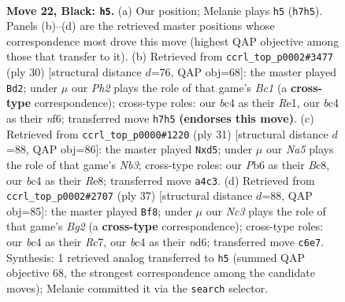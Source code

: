 \documentclass[11pt]{article}
\begin{document}
\clearpage

\begin{figure}[p]\centering
\begin{subfigure}{0.46\textwidth}\centering
\resizebox{\linewidth}{!}{%
\newchessgame
\chessboard[
  setfen={r1b4r/5k1p/ppn1p1p1/4Pp2/nbB2B2/1N3NP1/PP3P1P/RK1R4 b - - 5 22},
  showmover=false,
  pgfstyle=straightmove, color=movearrow, markmove={h7-h5}
]}
\caption{}
\end{subfigure}\hfill
\begin{subfigure}{0.46\textwidth}\centering
\resizebox{\linewidth}{!}{%
\newchessgame
\chessboard[
  setfen={rn3rk1/1p1bppbp/5np1/1p1P4/7N/2N3P1/PP3PBP/R1B1R1K1 w - - 0 16},
  showmover=false,
  pgfstyle=straightmove, color=movearrow, markmove={c1-d2}
]}
\caption{}
\end{subfigure}
\\[4pt]
\begin{subfigure}{0.46\textwidth}\centering
\resizebox{\linewidth}{!}{%
\newchessgame
\chessboard[
  setfen={r1b1r1k1/1p3p1p/pn1p2p1/2pP4/5Bn1/2P2NP1/P3PPBP/R3R1K1 b - - 0 16},
  showmover=false,
  pgfstyle=straightmove, color=movearrow, markmove={b6-d5}
]}
\caption{}
\end{subfigure}\hfill
\begin{subfigure}{0.46\textwidth}\centering
\resizebox{\linewidth}{!}{%
\newchessgame
\chessboard[
  setfen={r5k1/1pr2pb1/p2Nb1p1/4p2n/2P1P3/P3BP2/1P1R3P/2K2BR1 b - - 0 19},
  showmover=false,
  pgfstyle=straightmove, color=movearrow, markmove={g7-f8}
]}
\caption{}
\end{subfigure}
\caption{\textbf{Move 22, Black: \texttt{h5}.} (a) Our position; Melanie plays \texttt{h5} (\texttt{h7h5}). Panels (b)--(d) are the retrieved master positions whose correspondence most drove this move (highest QAP objective among those that transfer to it). (b) Retrieved from \texttt{ccrl\_top\_p0002\#3477} (ply 30) [structural distance $d$=76, QAP obj=68]: the master played \texttt{Bd2}; under $\mu$ our \emph{Ph2} plays the role of that game's \emph{Bc1} (a \textbf{cross-type} correspondence); cross-type roles: our \emph{b}c4 as their \emph{R}e1, our \emph{b}c4 as their \emph{n}f6; transferred move \texttt{h7h5} \textbf{(endorses this move)}. (c) Retrieved from \texttt{ccrl\_top\_p0000\#1220} (ply 31) [structural distance $d$=88, QAP obj=86]: the master played \texttt{Nxd5}; under $\mu$ our \emph{Na5} plays the role of that game's \emph{Nb3}; cross-type roles: our \emph{P}b6 as their \emph{B}c8, our \emph{b}c4 as their \emph{R}e8; transferred move \texttt{a4c3}. (d) Retrieved from \texttt{ccrl\_top\_p0002\#2707} (ply 37) [structural distance $d$=88, QAP obj=85]: the master played \texttt{Bf8}; under $\mu$ our \emph{Nc3} plays the role of that game's \emph{Bg2} (a \textbf{cross-type} correspondence); cross-type roles: our \emph{b}c4 as their \emph{R}c7, our \emph{b}c4 as their \emph{n}d6; transferred move \texttt{c6e7}. Synthesis: 1 retrieved analog transferred to \texttt{h5} (summed QAP objective 68, the strongest correspondence among the candidate moves); Melanie committed it via the \texttt{search} selector.}
\label{fig:thought-m43}
\end{figure}
\end{document}
